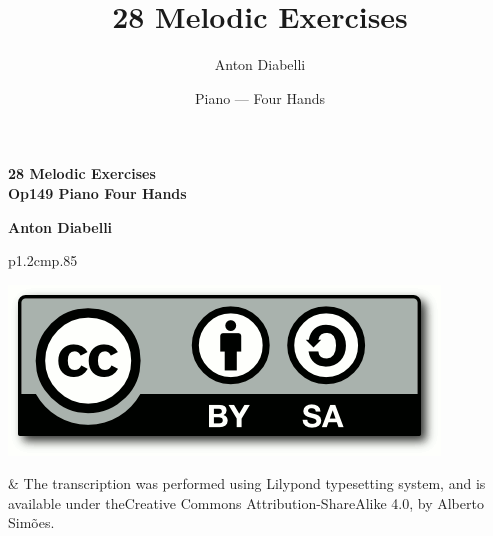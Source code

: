 \documentclass{book}
\title{28 Melodic Exercises}
\author{Anton Diabelli}
\date{Piano --- Four Hands}
\begin{document}
\fancyhead{} %
\fancyfoot{} %
\fancyfoot[CO,CE]{\thepage}
\renewcommand{\headrulewidth}{0pt}


\thispagestyle{empty}
\mbox{}\vfill
\begin{center}
	
	\huge\bfseries{}
	\huge  28 Melodic Exercises \\[5mm]
	\Large Op149
	\vskip 1cm
	\huge\bfseries{}
	\Large Piano Four Hands
\end{center}
\vfill
\vfill
\begin{center}
	\huge\bfseries{}
	Anton Diabelli
\end{center}
\vfill
\mbox{}\newpage
\pagestyle{plain}





\mbox{}\vfill
\begin{tabular}{p{1.2cm}p{.85\linewidth}}
\begin{minipage}{1cm}
\vskip 3mm
\includegraphics[scale=.1]{ccbysa.png}
\end{minipage} & The transcription was performed using Lilypond typesetting system, and is available under the\newline Creative Commons Attribution-ShareAlike 4.0, by Alberto Simões.
\end{tabular}
\end{document}
